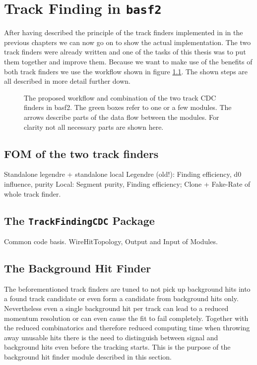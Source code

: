 \chapter{Track Finding in \texttt{basf2}}

After having described the principle of the track finders implemented in \basf in the previous chapters we can now go on to show the actual implementation. The two track finders were already written and one of the tasks of this thesis was to put them together and improve them. Because we want to make use of the benefits of both track finders we use the workflow shown in figure \ref{fig-workflow}. The shown steps are all described in more detail further down.

\begin{figure}
 \caption[Proposed workflow in the CDC tracking]{The proposed workflow and combination of the two track CDC finders in basf2. The green boxes refer to one or a few modules. The arrows describe parts of the data flow between the modules. For clarity not all necessary parts are shown here.}
 \label{fig-workflow}
\end{figure}


\section{FOM of the two track finders}

Standalone legendre + standalone local
Legendre (old!): Finding efficiency, d0 influence, purity
Local: Segment purity, Finding efficiency; Clone + Fake-Rate of whole track finder.

\section{The \texttt{TrackFindingCDC} Package}
Common code basis. WireHitTopology, Output and Input of Modules.

\section{The Background Hit Finder}
The beforementioned track finders are tuned to not pick up background hits into a found track candidate or even form a candidate from background hits only. Nevertheless even a single background hit per track can lead to a reduced momentum resolution or can even cause the fit to fail completely. Together with the reduced combinatorics and therefore reduced computing time when throwing away unusable hits there is the need to distinguish between signal and background hits even before the tracking starts. This is the purpose of the background hit finder module described in this section.

